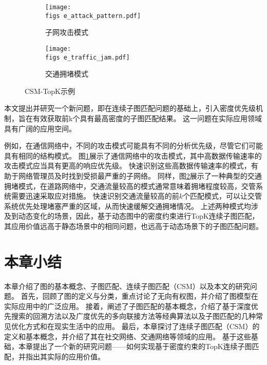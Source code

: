 \begin{figure}[h!]
    \def\wscorevone{0.49}
    \centering
        \begin{subfigure}[t]{\wscorevone\linewidth}
            \centering
            \resizebox{\linewidth}{!}
            {
                \texttt{[image: \\figs e\_attack\_pattern.pdf]}
            }
            \caption{子网攻击模式~\cite{static-topk-Gupta-DBLP:conf/icde/GuptaGYCH14}}
            \label{fig:example_attack_pattern}
        \end{subfigure}
        \hfill
        \begin{subfigure}[t]{\wscorevone\linewidth}
            \centering
            \resizebox{\linewidth}{!}
            {
                \texttt{[image: \\figs e\_traffic\_jam.pdf]}
            }
            \caption{交通拥堵模式~\cite{traffic-graph-matching-DBLP:journals/pvldb/SongGCW14}}
            \label{fig:example_traffic_jam}
        \end{subfigure}
        \label{fig:definition}
        \caption{CSM-TopK示例}
    \end{figure}


本文提出并研究一个新问题，即在连续子图匹配问题的基础上，引入密度优先级机制，旨在有效获取前k个具有最高密度的子图匹配结果。
这一问题在实际应用领域具有广阔的应用空间。

例如，在通信网络中，不同的攻击模式可能具有不同的分析优先级，尽管它们可能具有相同的结构模式。
图\ref{fig:example_attack_pattern}展示了通信网络中的攻击模式\cite{static-topk-Gupta-DBLP:conf/icde/GuptaGYCH14}，其中高数据传输速率的攻击模式应当具有更高的响应优先级。
快速识别这些高数据传输速率的模式，有助于网络管理员及时找到受损最严重的子网络。
同样，图\ref{fig:example_traffic_jam}展示了一种典型的交通拥堵模式\cite{traffic-graph-matching-DBLP:journals/pvldb/SongGCW14}，在道路网络中，交通流量较高的模式通常意味着拥堵程度较高，交管系统需要迅速采取应对措施。
快速识别交通流量较高的前$k$个匹配模式，可以让交管系统优先处理堵塞严重的区域，从而快速缓解交通拥堵情况。
上述两种模式均涉及到动态变化的场景，因此，基于动态图中的密度约束进行TopK连续子图匹配，其应用价值远高于静态场景中的相同问题，也远高于动态场景下的子图匹配问题。

\section{本章小结}
本章介绍了图的基本概念、子图匹配、连续子图匹配（CSM）以及本文的研究问题。
首先，回顾了图的定义与分类，重点讨论了无向有权图，并介绍了图模型在实际应用中的广泛应用。
接着，阐述了子图匹配的基本概念，介绍了基于深度优先搜索的回溯方法以及广度优先的多向联接方法等经典算法以及子图匹配的几种常见优化方式和在现实生活中的应用。
最后，本章探讨了连续子图匹配（CSM）的定义和基本概念，并介绍了其在社交网络、交通网络等领域的应用。
基于这些基础，本章提出了一个新的研究问题——如何实现基于密度约束的TopK连续子图匹配，并指出其实际的应用价值。